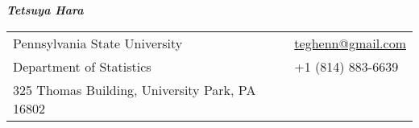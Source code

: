 \documentclass[utf8,letterpaper,oneside]{article}
\begin{document}
\noindent  \textit{\textbf{Tetsuya Hara}}%
\small
\begin{center}
 \begin{tabular}{l l}
  Pennsylvania State University                  & \hspace{1in} \href{mailto:teghenn@gmail.com}{teghenn@gmail.com} \\
  Department of Statistics                       & \hspace{1in}+1 (814) 883-6639                                                                                     \\
  325 Thomas Building, University Park, PA 16802 &                                                                                                                   \\
 \end{tabular}
\end{center}
\noindent
\end{document}
